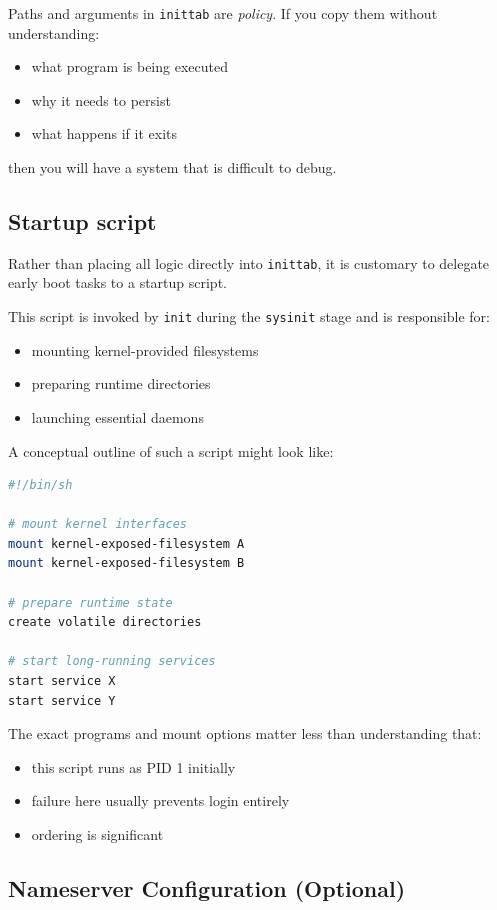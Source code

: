 \documentclass{../juni}
\begin{document}
Paths and arguments in \texttt{inittab} are \emph{policy}. If you copy them
without understanding:
\begin{itemize}
  \item what program is being executed
  \item why it needs to persist
  \item what happens if it exits
\end{itemize}
then you will have a system that is difficult to debug.

\subsection{Startup script}

Rather than placing all logic directly into \texttt{inittab}, it is customary to
delegate early boot tasks to a startup script.

This script is invoked by \texttt{init} during the \texttt{sysinit} stage and is
responsible for:
\begin{itemize}
  \item mounting kernel-provided filesystems
  \item preparing runtime directories
  \item launching essential daemons
\end{itemize}

A conceptual outline of such a script might look like:

\begin{lstlisting}[language=bash]
#!/bin/sh

# mount kernel interfaces
mount kernel-exposed-filesystem A
mount kernel-exposed-filesystem B

# prepare runtime state
create volatile directories

# start long-running services
start service X
start service Y
\end{lstlisting}

The exact programs and mount options matter less than understanding that:
\begin{itemize}
  \item this script runs as PID 1 initially
  \item failure here usually prevents login entirely
  \item ordering is significant
\end{itemize}

\subsection{Nameserver Configuration (Optional)}
\end{document}
